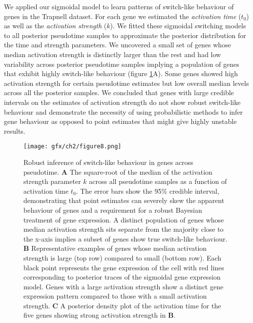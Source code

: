 We applied our sigmoidal model to learn patterns of switch-like behaviour of genes in the Trapnell dataset. For each gene we estimated the \emph{activation time} ($t_0$) as well as the \emph{activation strength} ($k$). We fitted these sigmoidal switching models to all posterior pseudotime samples to approximate the posterior distribution for the time and strength parameters. We uncovered a small set of genes whose median activation strength is distinctly larger than the rest and had low variability across posterior pseudotime samples implying a population of genes that exhibit highly switch-like behaviour (figure \ref{fig:switchres}A). Some genes showed high activation strength for certain pseudotime estimates but low overall median levels across all the posterior samples. We concluded that genes with large credible intervals on the estimates of activation strength do not show robust switch-like behaviour and demonstrate the necessity of using probabilistic methods to infer gene behaviour as opposed to point estimates that might give highly unstable results.

\begin{figure}
\centering
	\texttt{[image: gfx/ch2/figure8.png]}
\caption[Robust inference of switch-like behaviour in genes across pseudotime.]{ Robust inference of switch-like behaviour in genes across pseudotime.
\textbf{A} The square-root of the median of the activation strength parameter $k$ across all pseudotime samples as a function of activation time $t_0$. The error bars show the 95\% credible interval, demonstrating that point estimates can severely skew the apparent behaviour of genes and a requirement for a robust Bayesian treatment of gene expression. A distinct population of genes whose median activation strength sits separate from the majority close to the x-axis implies a subset of genes show true switch-like behaviour. \textbf{B} Representative examples of genes whose median activation strength is large (top row) compared to small (bottom row). Each black point represents the gene expression of the cell with red lines corresponding to posterior traces of the sigmoidal gene expression model. Genes with a large activation strength show a distinct gene expression pattern compared to those with a small activation strength. \textbf{C} A posterior density plot of the activation time for the five genes showing strong activation strength in \textbf{B}.} \label{fig:switchres}
\end{figure}

